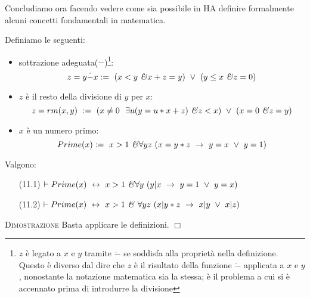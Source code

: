 \newpage Concludiamo ora facendo vedere come sia possibile in HA definire formalmente alcuni concetti fondamentali in matematica.

\begin{defi}
Definiamo le seguenti:
\vspace{.1cm}
\begin{itemize}
\item sottrazione adeguata($\dot{-}$)\footnote{$z$ \`e legato a $x$ e $y$ tramite $\dot{-}$ se soddisfa alla propriet\`a nella definizione. Questo \`e diverso dal dire che $z$ \`e il risultato della funzione $\dot{-}$ applicata a $x$ e $y$, nonostante la notazione matematica sia la stessa; \`e il problema a cui si \`e accennato prima di introdurre la divisione}: {\footnotesize{$$z=y\dot{-} x:=\ (x<y\ \mbox{\emph{\&}} x+z=y)\ \vee\ (y\leq x\ \mbox{\emph{\&}} z=0)$$}}
\vspace{.1cm}
\item $z$ \`e il resto della divisione di $y$ per $x$:{\footnotesize{ $$z=rm(x,y)\ :=\ (x\neq 0\ \ \exists u(y=u*x+z)\ \mbox{\emph{\&}} z<x)\ \vee\ (x=0\ \mbox{\emph{\&}} z=y)$$}}
\vspace{.1cm}
\item $x$ \`e un numero primo: {\footnotesize{$$Prime(x):=\ x>1\ \mbox{\emph{\&}} \forall yz\  (x=y*z\ \to\ y=x\ \vee\ y=1)$$}}
\end{itemize}
\end{defi}

\vspace{.2cm}
\begin{prop} Valgono:
\vspace{.2cm}
\begin{enumerate}
	\item[(11.1)] $\vdash Prime(x)\ \leftrightarrow\ x>1\ \mbox{\emph{\&}} \forall y\ (y|x\ \to\ y=1\ \vee\ y=x)$
	\vspace{.2cm}
	\item[(11.2)] $\vdash Prime(x)\ \leftrightarrow\ x>1\ \mbox{\emph{\&}}\ \forall yz\ (x|y*z\ \to\ x|y\ \vee\ x|z)$
\end{enumerate}
\end{prop}
\vspace{.5cm}
\textsc{Dimostrazione}
Basta applicare le definizioni.
 $\Box$\\


